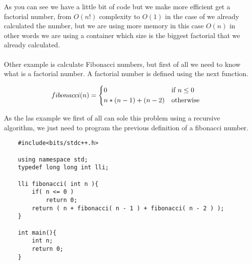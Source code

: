 As you can see we have a little bit of code but we make more efficient get a factorial number, from $O(n!)$ complexity to $O(1)$ in the case of we already calculated the number, but we are using more memory in this case $O(n)$ in other words we are using a container which size is the biggest factorial that we already calculated.\\\\

Other example is calculate Fibonacci numbers, but first of all we need to know what is a factorial number. A factorial number is defined using the next function.

\[
    fibonacci(n) = 
    \begin{cases*}
        0 & if $n \leq 0$ \\    
        n * ( n - 1 ) + ( n - 2 ) & otherwise 
    \end{cases*}    
\]

As the las example we first of all can sole this problem using a recursive algorithm, we just need to program the previous definition of a fibonacci number.

\begin{lstlisting}
    #include<bits/stdc++.h>

    using namespace std;
    typedef long long int lli;

    lli fibonacci( int n ){
        if( n <= 0 )
            return 0;
        return ( n + fibonacci( n - 1 ) + fibonacci( n - 2 ) );
    }

    int main(){
        int n;
        return 0;
    }
\end{lstlisting}

